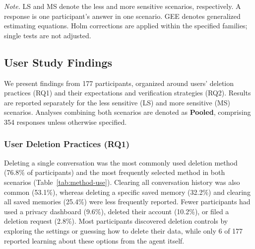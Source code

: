 \begin{table}[t]
\par\vspace{0.5em}
\begin{minipage}{0.94\textwidth}
\footnotesize
\textit{Note.} LS and MS denote the less and more sensitive scenarios, respectively.
A response is one participant's answer in one scenario.
GEE denotes generalized estimating equations.
Holm corrections are applied within the specified families;
single tests are not adjusted.
\end{minipage}
\end{table}

\subsection{User Study Findings}
\label{sec:qual_results}

We present findings from 177 participants, organized around users' deletion practices (RQ1) and their expectations and verification strategies (RQ2).
%
Results are reported separately for the less sensitive (LS) and more sensitive (MS) scenarios.
%
Analyses combining both scenarios are denoted as \textbf{Pooled}, comprising 354 responses unless otherwise specified.

\subsubsection{User Deletion Practices (RQ1)}

Deleting a single conversation was the most commonly used deletion method (76.8\% of participants) and the most frequently selected method in both scenarios (Table~\ref{tab:method-use}).
%
Clearing all conversation history was also common (53.1\%), whereas deleting a specific saved memory (32.2\%) and clearing all saved memories (25.4\%) were less frequently reported.
%
Fewer participants had used a privacy dashboard (9.6\%), deleted their account (10.2\%), or filed a deletion request (2.8\%).
%
Most participants discovered deletion controls by exploring the settings or guessing how to delete their data, while only 6 of 177 reported learning about these options from the agent itself.


